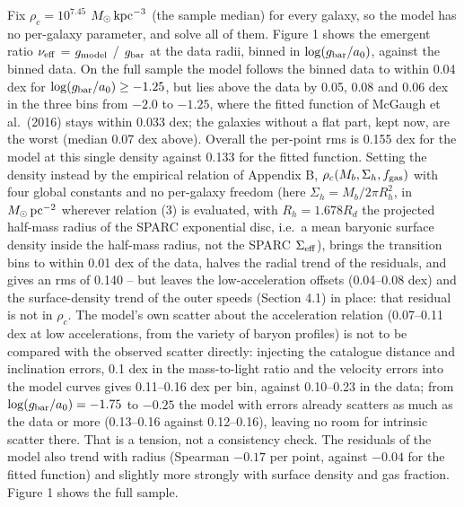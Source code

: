 \documentclass[
  10pt,
]{article}
\begin{document}
Fix $\rho_c=10^{7.45}$ $M_\odot\,{\rm kpc}^{-3}$ (the sample median) for every
galaxy, so the model has no per-galaxy parameter, and solve all of them.
Figure 1 shows the emergent ratio $\nu_{\rm eff}$ = $g_{\rm model}$ / $g_{\rm bar}$ at the
data radii, binned in $\log(g_{\rm bar}/a_0)$, against the binned data. On the full sample the model follows the binned data to within 0.04 dex for $\log(g_{\rm bar}/a_0)\ge-1.25$, but lies above the data by 0.05, 0.08 and 0.06 dex in the three bins from $-2.0$ to $-1.25$, where the fitted function of McGaugh et al.~(2016) stays within 0.033 dex; the galaxies without a flat part, kept now, are the worst (median 0.07 dex above). Overall the per-point rms is 0.155 dex for the model at this single density against 0.133 for the fitted function. Setting the density instead by the empirical relation of Appendix B, $\rho_c(M_b,\Sigma_h,f_{\rm gas})$ with four global constants and no per-galaxy freedom (here $\Sigma_h=M_b/2\pi R_h^2$, in $M_\odot\,{\rm pc}^{-2}$ wherever relation (3) is evaluated, with $R_h=1.678R_d$ the projected half-mass radius of the SPARC exponential disc, i.e.\ a mean baryonic surface density inside the half-mass radius, not the SPARC $\Sigma_{\rm eff}$), brings the transition bins to within 0.01 dex of the data, halves the radial trend of the residuals, and gives an rms of 0.140 -- but leaves the low-acceleration offsets (0.04--0.08 dex) and the surface-density trend of the outer speeds (Section 4.1) in place: that residual is not in $\rho_c$. The model's own scatter about the acceleration relation (0.07--0.11 dex at low accelerations, from the variety of baryon profiles) is not to be compared with the observed scatter directly: injecting the catalogue distance and inclination errors, 0.1 dex in the mass-to-light ratio and the velocity errors into the model curves gives 0.11--0.16 dex per bin, against 0.10--0.23 in the data; from $\log(g_{\rm bar}/a_0)=-1.75$ to $-0.25$ the model with errors already scatters as much as the data or more (0.13--0.16 against 0.12--0.16), leaving no room for intrinsic scatter there. That is a tension, not a consistency check. The residuals of the model also trend with radius (Spearman $-0.17$ per point, against $-0.04$ for the fitted function) and slightly more strongly with surface density and gas fraction. Figure 1 shows the full sample.
\end{document}
